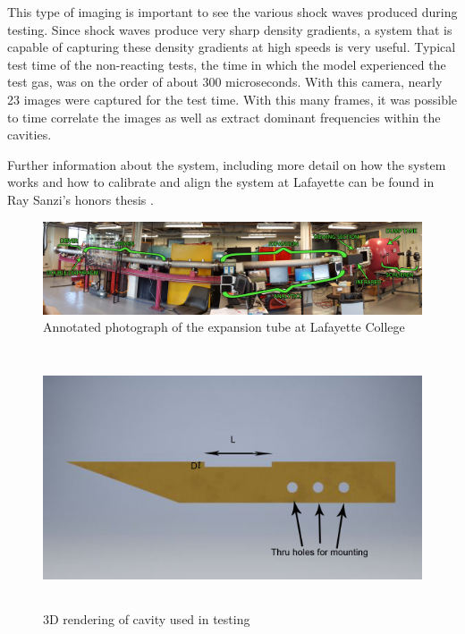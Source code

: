 This type of imaging is important to see the various shock waves produced during testing. Since shock waves produce very sharp density gradients, a system that is capable of capturing these density gradients at high speeds is very useful. Typical test time of the non-reacting tests, the time in which the model experienced the test gas,  was on the order of about 300 microseconds. With this camera, nearly 23 images were captured for the test time.  With this many frames, it was possible to time correlate the images as well as extract dominant frequencies within the cavities.

Further information about the system, including more detail on how the system works and how to calibrate and align the system at Lafayette can be found in Ray Sanzi's honors thesis \cite{Sanzi2016}.



\newpage

\begin{figure}
\centering
\includegraphics[width=\textwidth]{Figures/TubeLabeled.jpg}
\caption[Annotated Expansion Tube]{Annotated photograph of the expansion tube at Lafayette College}
\label{fig:tubelabeled}
\end{figure}

\begin{figure}
\centering
\includegraphics[height = 3in]{Figures/Cavitylabel.jpg}
\caption[Cavity 3D Model]{3D rendering of cavity used in testing}
\label{fig:cavModel}
\end{figure}


